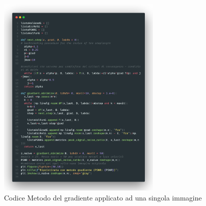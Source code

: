 \begin{figure}[H]
    \includegraphics[width=0.7\textwidth]{imgCode/metGrad.png}
    \caption{Codice Metodo del gradiente applicato ad una singola immagine}
\end{figure}

